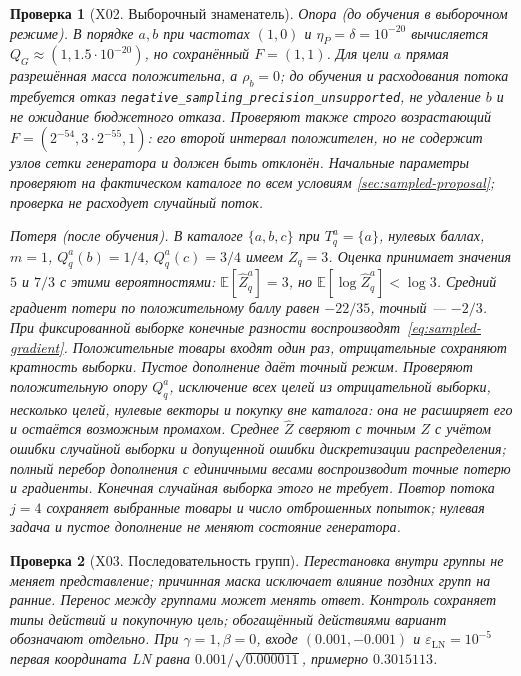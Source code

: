 \documentclass[12pt,a4paper]{article}
\newcommand{\code}[1]{{\ttfamily\small\nolinkurl{#1}}}
\newcommand{\E}{\mathbb E}
\newcommand{\eps}{\varepsilon}
\theoremstyle{plainru}
\newtheorem{testcase}{Проверка}[section]
\begin{document}
\begin{testcase}[X02. Выборочный знаменатель]
\emph{Опора (до обучения в выборочном режиме).}
В порядке $a,b$ при частотах $(1,0)$ и $\eta_P=\delta=10^{-20}$
вычисляется $Q_G\approx(1,1.5\cdot10^{-20})$, но сохранённый $F=(1,1)$.
Для цели $a$ прямая разрешённая масса положительна, а $\rho_b=0$;
до обучения и расходования потока требуется отказ
\code{negative_sampling_precision_unsupported}, не удаление $b$ и
не ожидание бюджетного отказа. Проверяют также строго возрастающий
$F=(2^{-54},3\cdot2^{-55},1)$: его второй интервал положителен,
но не содержит узлов сетки генератора и должен быть отклонён.
Начальные параметры проверяют на фактическом каталоге по всем условиям
\ref{sec:sampled-proposal}; проверка не расходует случайный поток.

\emph{Потеря (после обучения).}
В каталоге $\{a,b,c\}$ при $T_q^a=\{a\}$, нулевых баллах,
$m=1$, $Q_q^a(b)=1/4$, $Q_q^a(c)=3/4$ имеем $Z_q=3$.
Оценка принимает значения $5$ и $7/3$ с этими вероятностями:
$\E[\widehat Z_q^a]=3$, но $\E[\log\widehat Z_q^a]<\log3$.
Средний градиент потери по положительному баллу равен $-22/35$,
точный --- $-2/3$. При фиксированной выборке конечные разности
воспроизводят~\eqref{eq:sampled-gradient}.
Положительные товары входят один раз, отрицательные сохраняют
кратность выборки. Пустое дополнение даёт точный режим.
Проверяют положительную опору $Q_q^a$, исключение всех целей из
отрицательной выборки, несколько целей, нулевые векторы
и покупку вне каталога: она не расширяет его и остаётся возможным промахом.
Среднее $\widehat Z$ сверяют с точным $Z$ с учётом ошибки случайной
выборки и допущенной ошибки дискретизации распределения;
полный перебор дополнения с единичными весами воспроизводит точные
потерю и градиенты. Конечная случайная выборка этого не требует.
Повтор потока $j=4$ сохраняет выбранные товары и число отброшенных попыток;
нулевая задача и пустое дополнение не меняют состояние генератора.
\end{testcase}

\begin{testcase}[X03. Последовательность групп]
Перестановка внутри группы не меняет представление; причинная маска
исключает влияние поздних групп на ранние. Перенос между группами
может менять ответ. Контроль сохраняет типы действий и покупочную цель;
обогащённый действиями вариант обозначают отдельно.
При $\gamma=1,\beta=0$, входе $(0.001,-0.001)$ и $\eps_{\mathrm{LN}}=10^{-5}$
первая координата LN равна $0.001/\sqrt{0.000011}$, примерно $0.3015113$.
\end{testcase}
\end{document}
